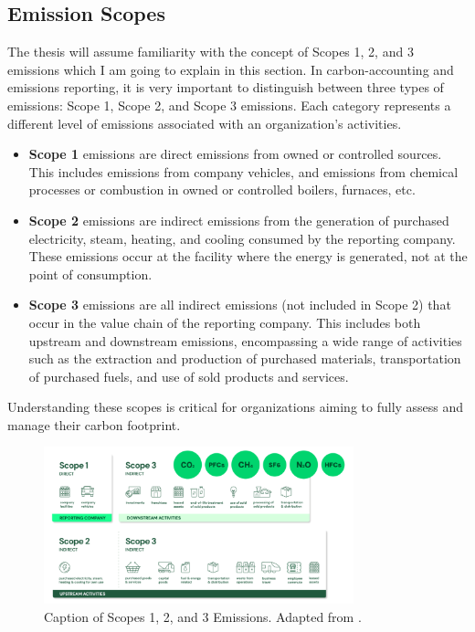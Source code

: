 \subsection{Emission Scopes}
The thesis will assume familiarity with the concept of Scopes 1, 2, and 3 emissions which I am going to explain in this section. In carbon-accounting and emissions reporting, it is very important to distinguish between three types of emissions: Scope 1, Scope 2, and Scope 3 emissions. Each category represents a different level of emissions associated with an organization's activities. 

\begin{itemize}
    \item \textbf{Scope 1} emissions are direct emissions from owned or controlled sources. This includes emissions from company vehicles, and emissions from chemical processes or combustion in owned or controlled boilers, furnaces, etc.
    \item \textbf{Scope 2} emissions are indirect emissions from the generation of purchased electricity, steam, heating, and cooling consumed by the reporting company. These emissions occur at the facility where the energy is generated, not at the point of consumption.
    \item \textbf{Scope 3} emissions are all indirect emissions (not included in Scope 2) that occur in the value chain of the reporting company. This includes both upstream and downstream emissions, encompassing a wide range of activities such as the extraction and production of purchased materials, transportation of purchased fuels, and use of sold products and services.
\end{itemize}

\noindent Understanding these scopes is critical for organizations aiming to fully assess and manage their carbon footprint.

\newpage
\begin{figure}[h]
    \centering
    \includegraphics[width=0.8\textwidth]{figures/emission_scopes.png}
    \caption{Caption of Scopes 1, 2, and 3 Emissions. Adapted from \cite{Bernoville2022Scopes}.}
    \label{fig:my_label}
\end{figure}


